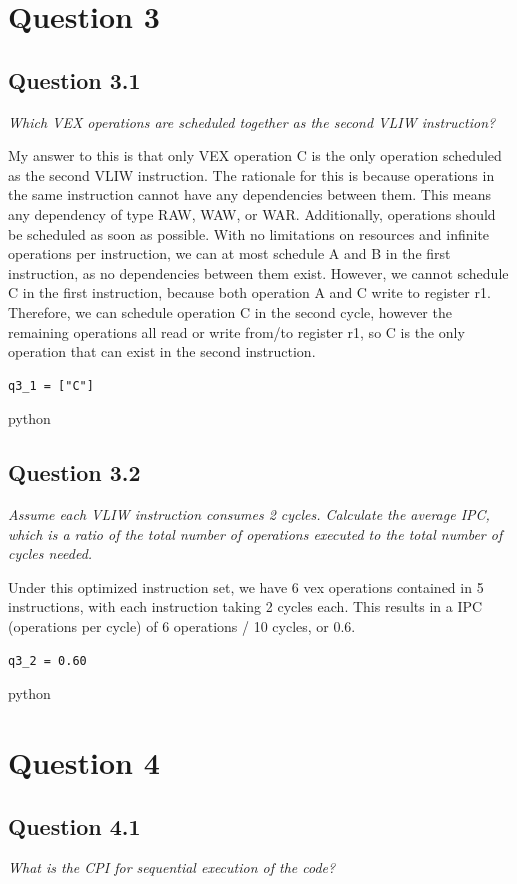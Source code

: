\documentclass[
	letterpaper, %
]{jdf}
\begin{document}
\section{Question 3}

\subsection{Question 3.1}
\textit{Which VEX operations are scheduled together as the second VLIW instruction?}

My answer to this is that only VEX operation C is the only operation scheduled as the second VLIW instruction. The rationale for this is because operations in the same instruction cannot have any dependencies between them. This means any dependency of type RAW, WAW, or WAR. Additionally, operations should be scheduled as soon as possible. With no limitations on resources and infinite operations per instruction, we can at most schedule A and B in the first instruction, as no dependencies between them exist. However, we cannot schedule C in the first instruction, because both operation A and C write to register r1. Therefore, we can schedule operation C in the second cycle, however the remaining operations all read or write from/to register r1, so C is the only operation that can exist in the second instruction.
\begin{verbatim}
q3_1 = ["C"]
\end{verbatim}{python}
\subsection{Question 3.2}
\textit{Assume each VLIW instruction consumes 2 cycles. Calculate the average IPC, which is a ratio of the total number of operations executed to the total number of cycles needed.}

Under this optimized instruction set, we have 6 vex operations contained in 5 instructions, with each instruction taking 2 cycles each. This results in a IPC (operations per cycle) of 6 operations / 10 cycles, or 0.6.

\begin{verbatim}
q3_2 = 0.60
\end{verbatim}{python}

\section{Question 4}
\subsection{Question 4.1}
\textit{What is the CPI for sequential execution of the code?}
\end{document}
